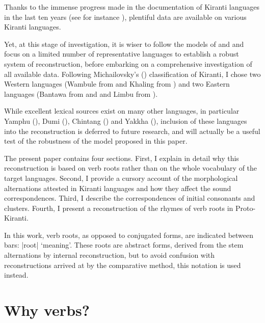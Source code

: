 \documentclass[oneside,a4paper,11pt]{article}
\newcommand{\ipa}[1]{{\phon\mbox{#1}}} %
\newcommand{\dhatu}[2]{|\ipa{#1}| `#2'}
\begin{document}
Thanks to the immense progress made in the documentation of Kiranti languages in the last ten years (see for instance \citealt{bickel07chintang, bickel07puma, schackow08puma, doornenbal09, lahaussois09, huysmans2011sampang, schackow15yakkha}), plentiful data are available on various Kiranti languages. 

Yet, at this stage of investigation, it is wiser to follow the models of \citet{bloomfield25central} and \citet{dempwolff34induktiver} and focus on a limited number of representative languages to establish a robust system of reconstruction, before embarking on a comprehensive investigation of all available data. Following Michailovsky's (\citeyear{michailovsky94stops}) classification of Kiranti, I chose two Western languages (Wambule  from \citealt{opgenort04wambule} and Khaling from \citealt{jacques12khaling, jacques15khaling}) and two Eastern languages (Bantawa from \citealt{doornenbal09} and \citealt{winter03bantawa} and Limbu from \citealt{driem87, michailovsky02dico}). 

 

While excellent lexical sources exist on many other languages, in particular  Yamphu (\citealt{rutgers98yamphu}), Dumi  (\citealt{driem93dumi, rai11dumi}), Chintang  (\citealt{rai11chintang}) and  Yakkha  (\citealt{kongren07yakkha}), inclusion of these languages into the reconstruction is deferred to future research, and will actually be a useful test of the robustness of the model proposed in this paper.

The present paper contains four sections. First, I explain in detail why this reconstruction is based on verb roots rather than on the whole vocabulary of the target languages. Second, I provide a cursory account of the morphological alternations attested in Kiranti languages and how they affect the sound correspondences. Third, I describe the correspondences of initial consonants and clusters. Fourth, I present a reconstruction of the rhymes of verb roots in Proto-Kiranti.

In this work, verb roots, as opposed to conjugated forms, are indicated between bars: \dhatu{root}{meaning}. These roots are abstract forms, derived from the stem alternations by internal reconstruction, but to avoid confusion with reconstructions arrived at by the comparative method, this notation is used instead. 

\section{Why verbs?} \label{sec:why}
\end{document}
